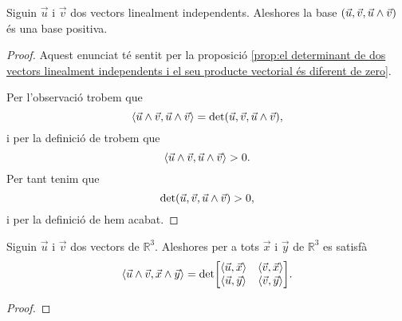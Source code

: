 \documentclass[../Apunts.tex]{subfiles}
\begin{document}
	\begin{proposition}
		\label{prop:dos vectors linealment independents i el seu producte vectorial formen una base positiva}
		Siguin \(\vec{u}\) i \(\vec{v}\) dos vectors linealment independents. Aleshores la base \((\vec{u},\vec{v},\vec{u}\mathbin{\wedge}\vec{v})\) és una base positiva.
		\begin{proof}
			Aquest enunciat té sentit per la proposició \ref{prop:el determinant de dos vectors linealment independents i el seu producte vectorial és diferent de zero}.
			
			Per l'observació  trobem que
			\[\prodesc{\vec{u}\prodvec\vec{v}}{\vec{u}\prodvec\vec{v}}=\det(\vec{u},\vec{v},\vec{u}\prodvec\vec{v}),\]
			i per la definició de  trobem que
			\[\prodesc{\vec{u}\prodvec\vec{v}}{\vec{u}\prodvec\vec{v}}>0.\]
			Per tant tenim que
			\[\det(\vec{u},\vec{v},\vec{u}\mathbin{\wedge}\vec{v})>0,\]
			i per la definició de  hem acabat.
		\end{proof}
	\end{proposition}
	\begin{proposition}
		\label{prop:fórmula de Lagrange}
		Siguin \(\vec{u}\) i \(\vec{v}\) dos vectors de \(\mathbb{R}^{3}\). Aleshores per a tots \(\vec{x}\) i \(\vec{y}\) de \(\mathbb{R}^{3}\) es satisfà
		\[\prodesc{\vec{u}\prodvec\vec{v}}{\vec{x}\prodvec\vec{y}}=\det\left[\begin{matrix}
			\prodesc{\vec{u}}{\vec{x}} & \prodesc{\vec{v}}{\vec{x}} \\
			\prodesc{\vec{u}}{\vec{y}} & \prodesc{\vec{v}}{\vec{y}}
		\end{matrix}\right].\]
		\begin{proof}
		\end{proof}
	\end{proposition}
\end{document}
